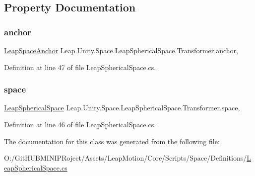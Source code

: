 \subsection{Property Documentation}
\mbox{\label{class_leap_1_1_unity_1_1_space_1_1_leap_spherical_space_1_1_transformer_a074822bd99def96e0a6b73b3b7aa3b56}} 
\subsubsection{\texorpdfstring{anchor}{anchor}}
{\footnotesize\ttfamily \mbox{\hyperlink{class_leap_1_1_unity_1_1_space_1_1_leap_space_anchor}{Leap\+Space\+Anchor}} Leap.\+Unity.\+Space.\+Leap\+Spherical\+Space.\+Transformer.\+anchor\hspace{0.3cm}{\ttfamily [get]}, {\ttfamily [set]}}



Definition at line 47 of file Leap\+Spherical\+Space.\+cs.

\mbox{\label{class_leap_1_1_unity_1_1_space_1_1_leap_spherical_space_1_1_transformer_a61cb8c82630ced9054828f14b1129f2d}} 
\subsubsection{\texorpdfstring{space}{space}}
{\footnotesize\ttfamily \mbox{\hyperlink{class_leap_1_1_unity_1_1_space_1_1_leap_spherical_space}{Leap\+Spherical\+Space}} Leap.\+Unity.\+Space.\+Leap\+Spherical\+Space.\+Transformer.\+space\hspace{0.3cm}{\ttfamily [get]}, {\ttfamily [set]}}



Definition at line 46 of file Leap\+Spherical\+Space.\+cs.



The documentation for this class was generated from the following file\+:\begin{DoxyCompactItemize}
\item 
O\+:/\+Git\+H\+U\+B\+M\+I\+N\+I\+P\+Roject/\+Assets/\+Leap\+Motion/\+Core/\+Scripts/\+Space/\+Definitions/\mbox{\hyperlink{_leap_spherical_space_8cs}{Leap\+Spherical\+Space.\+cs}}\end{DoxyCompactItemize}
